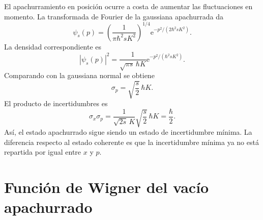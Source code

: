 \documentclass[11pt]{article}
\newcommand{\ee}{\mathrm{e}}
\begin{document}
El apachurramiento en posici\'on ocurre a costa de aumentar las fluctuaciones
en momento. La transformada de Fourier de la gaussiana apachurrada da
\begin{equation}
  \psi_s(p)
  =
  \left(\frac{1}{\pi\hbar^2sK^2}\right)^{1/4}
  \ee^{-p^2/(2\hbar^2sK^2)}.
\end{equation}
La densidad correspondiente es
\begin{equation}
  |\psi_s(p)|^2
  =
  \frac{1}{\sqrt{\pi s}\,\hbar K}
  \ee^{-p^2/(\hbar^2sK^2)}.
\end{equation}
Comparando con la gaussiana normal se obtiene
\begin{equation}
  \boxed{
  \sigma_p=\sqrt{\frac{s}{2}}\,\hbar K.
  }
\end{equation}
El producto de incertidumbres es
\begin{equation}
  \sigma_x\sigma_p
  =
  \frac{1}{\sqrt{2s}\,K}
  \sqrt{\frac{s}{2}}\,\hbar K
  =
  \frac{\hbar}{2}.
\end{equation}
As\'i, el estado apachurrado sigue siendo un estado de incertidumbre m\'inima.
La diferencia respecto al estado coherente es que la incertidumbre m\'inima ya
no est\'a repartida por igual entre $x$ y $p$.

\section{Funci\'on de Wigner del vac\'io apachurrado}
\end{document}
